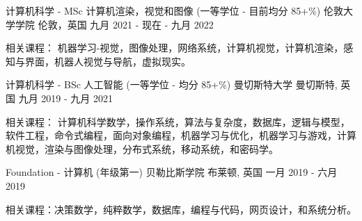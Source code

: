 

\begin{cventries}

  \cventry
    {计算机科学 - MSc 计算机渲染，视觉和图像 (一等学位 - 目前均分 85+\%)} %
    {伦敦大学学院} %
    {伦敦，英国} %
    {九月 2021 - 现在 - 九月 2022} %
    {
      \begin{cvitems} %
        \item {相关课程： 机器学习-视觉，图像处理，网络系统，计算机视觉，计算机渲染，感知与界面，机器人视觉与导航，虚拟现实。}
      \end{cvitems}
    }
    
  \cventry
    {计算机科学 - BSc 人工智能 (一等学位 - 均分 85+\%)} %
    {曼切斯特大学} %
    {曼切斯特, 英国} %
    {九月 2019 - 九月 2021} %
    {
      \begin{cvitems} %
        \item {相关课程： 计算机科学数学，操作系统，算法与复杂度，数据库，逻辑与模型，软件工程，命令式编程，面向对象编程，机器学习与优化，机器学习与游戏，计算机视觉，渲染与图像处理，分布式系统，移动系统，和密码学。}
      \end{cvitems}
    }
    
    \cventry
    {Foundation - 计算机 (年级第一)} %
    {贝勒比斯学院} %
    {布莱顿, 英国} %
    {一月 2019 - 六月 2019} %
    {
     \begin{cvitems} %
        \item {相关课程：决策数学，纯粹数学，数据库，编程与代码，网页设计，和系统分析。}
      \end{cvitems}
    }
    

\end{cventries}
